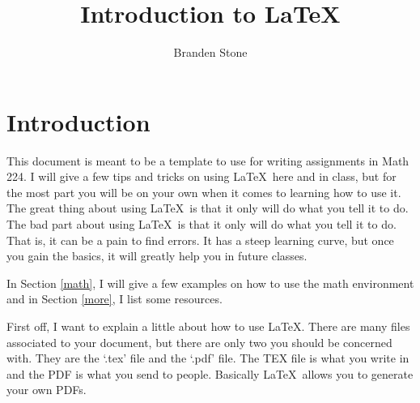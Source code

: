\documentclass{amsart}
\title{Introduction to \LaTeX}
\author{Branden Stone}
\begin{document}
	

\maketitle

	

\section{Introduction} %

   This document is meant to be a template to use for writing assignments in Math 224. I will give a few tips and tricks on using \LaTeX\ here and in class, but for the most part you will be on your own when it comes to learning how to use it. The great thing about using \LaTeX\ is that it only will do what you tell it to do. The bad part about using \LaTeX\ is that it only will do what you tell it to do. That is, it can be a pain to find errors. It has a steep learning curve, but once you gain the basics, it will greatly help you in future classes. 


   In Section \ref{math}, I will give a few examples on how to use the math environment and in Section \ref{more}, I list some resources.  

   First off, I want to explain a little about how to use \LaTeX. There are many files associated to your document, but there are only two you should be concerned with. They are the `.tex' file and the `.pdf' file. The TEX file is what you write in and the PDF is what you send to people.  Basically \LaTeX\ allows you to generate your own PDFs. 
\end{document}
